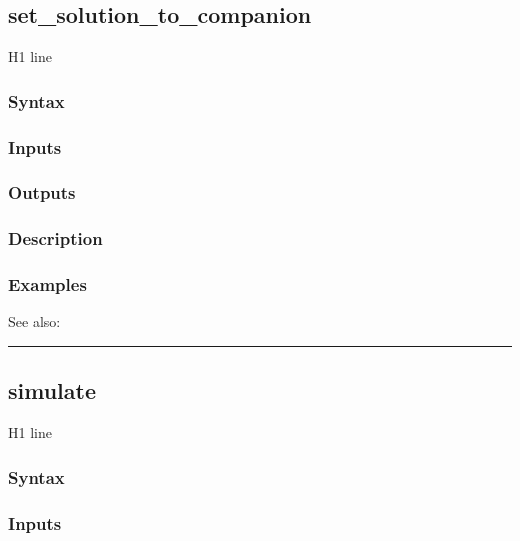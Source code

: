 \documentclass[letterpaper,10pt,english]{sphinxmanual}
\begin{document}
\subsection{set\_solution\_to\_companion}
\label{classes/models/@svar/svar:id109}\label{classes/models/@svar/svar:set-solution-to-companion}
H1 line


\subsubsection{Syntax}
\label{classes/models/@svar/svar:id110}

\subsubsection{Inputs}
\label{classes/models/@svar/svar:id111}

\subsubsection{Outputs}
\label{classes/models/@svar/svar:id112}

\subsubsection{Description}
\label{classes/models/@svar/svar:id113}

\subsubsection{Examples}
\label{classes/models/@svar/svar:id114}
See also:


\bigskip\hrule{}\bigskip



\subsection{simulate}
\label{classes/models/@svar/svar:simulate}\label{classes/models/@svar/svar:id115}
H1 line


\subsubsection{Syntax}
\label{classes/models/@svar/svar:id116}

\subsubsection{Inputs}
\label{classes/models/@svar/svar:id117}
\end{document}
